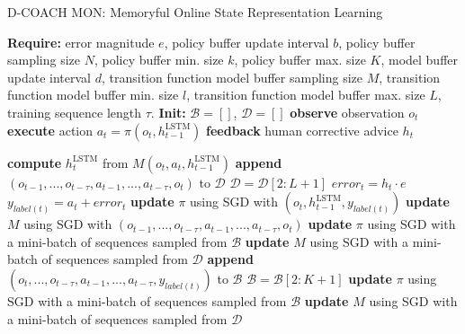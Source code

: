 \begin{algorithm}[H]
\caption{D-COACH MON: Memoryful Online State Representation Learning}\label{algorithm:DeepCOACH-M}
\begin{algorithmic}[1]
\State \textbf{Require:} error magnitude $e$, policy buffer update interval $b$, policy buffer sampling size $N$, policy buffer min. size $k$, policy buffer max. size $K$, model buffer update interval $d$, transition function model buffer sampling size $M$, transition function model buffer min. size $l$, transition function model buffer max. size $L$, training sequence length $\tau$.
\State \textbf{Init:} $\mathcal{B} = []$, $\mathcal{D} = []$
\State \textbf{observe} observation $o_{t}$
\State \textbf{execute} action $a_{t}=\pi(o_{t}, h^{\mathrm{LSTM}}_{t-1})$
\State \textbf{feedback} human corrective advice $h_{t}$
\end{algorithmic}
\end{algorithm}

\begin{algorithm}            
\begin{algorithmic} [1]                  
\State \textbf{compute} $h^{\mathrm{LSTM}}_{t}$ from $M(o_{t}, a_{t},h^{\mathrm{LSTM}}_{t-1})$
\State \textbf{append} $(o_{t-1},...,o_{t-\tau},a_{t-1},...,a_{t-\tau},o_{t})$ to $\mathcal{D}$
\State $\mathcal{D} = \mathcal{D}[2:L+1]$
\EndIf
{}
\State $\mathit{error}_{t} = h_{t}\cdot e$
\State $y_{label(t)} = a_{t} + \mathit{error}_{t}$ 
\State \textbf{update} $\pi$ using SGD with $(o_{t}, h^{\mathrm{LSTM}}_{t-1}, y_{\mathit{label}(t)})$ 
\State \textbf{update} $M$ using SGD with $(o_{t-1},...,o_{t-\tau},a_{t-1},...,a_{t-\tau},o_{t})$
\State \textbf{update} $\pi$ using SGD with a mini-batch of sequences sampled from $\mathcal{B}$
\State \textbf{update} $M$ using SGD with a mini-batch of sequences sampled from $\mathcal{D}$
\State \textbf{append} $(o_{t},...,o_{t-\tau},a_{t-1},...,a_{t-\tau}, y_{\mathit{label}(t)})$ to $\mathcal{B}$
\State $\mathcal{B} = \mathcal{B}[2:K+1]$
\EndIf
\EndIf
{}
\State \textbf{update} $\pi$ using SGD with a mini-batch of sequences sampled from $\mathcal{B}$
\EndIf
{}
\State \textbf{update} $M$ using SGD with a mini-batch of sequences sampled from $\mathcal{D}$
\EndIf
\EndFor
\end{algorithmic}
\end{algorithm}


